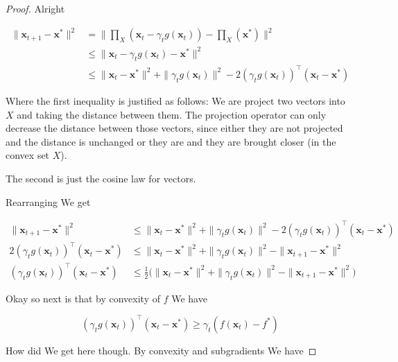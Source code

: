 \documentclass{article}
\begin{document}
		\begin{proof}
			Alright
			
			\begin{align*}
				\|\mathbf{x}_{t+1} - \mathbf{x}^* \|^2 &= \| \prod_X(\mathbf{x}_t - \gamma_t g(\mathbf{x}_t)) - \prod_X(\mathbf{x}^*) \|^2 \\
				&\le \| \mathbf{x}_t - \gamma_t g(\mathbf{x}_t) - \mathbf{x}^* \|^2\\
				&\le \| \mathbf{x}_t - \mathbf{x}^* \|^2  + \|\gamma_t g(\mathbf{x}_t) \|^2 - 2(\gamma_t g(\mathbf{x}_t))^\top ( \mathbf{x}_t - \mathbf{x}^*)
			\end{align*}
			
			Where the first inequality is justified as follows: We are project two vectors into $X$ and taking the distance between them. The projection operator can only decrease the distance between those vectors, since either they are not projected and the distance is unchanged or they are and they are brought closer (in the convex set $X$).
			
			The second is just the cosine law for vectors.
			
			Rearranging We get
			
			\begin{align*}
				\|\mathbf{x}_{t+1} - \mathbf{x}^* \|^2 &\le \| \mathbf{x}_t - \mathbf{x}^* \|^2  + \|\gamma_t g(\mathbf{x}_t) \|^2 - 2(\gamma_t g(\mathbf{x}_t))^\top ( \mathbf{x}_t - \mathbf{x}^*)\\
				 2(\gamma_t g(\mathbf{x}_t))^\top ( \mathbf{x}_t - \mathbf{x}^*)&\le \| \mathbf{x}_t - \mathbf{x}^* \|^2  + \|\gamma_t g(\mathbf{x}_t) \|^2  - \|\mathbf{x}_{t+1} - \mathbf{x}^* \|^2\\
				(\gamma_t g(\mathbf{x}_t))^\top ( \mathbf{x}_t - \mathbf{x}^*)&\le\frac{1}{2}\big( \| \mathbf{x}_t - \mathbf{x}^* \|^2  + \|\gamma_t g(\mathbf{x}_t) \|^2  - \|\mathbf{x}_{t+1} - \mathbf{x}^* \|^2 \big)
			\end{align*}
			
			Okay so next is that by convexity of $f$ We have
			
			\[ (\gamma_t g(\mathbf{x}_t))^\top ( \mathbf{x}_t - \mathbf{x}^*) \ge \gamma_t(f(\mathbf{x}_t )- f^*)  \]
			
			How did We get here though. By convexity and subgradients We have
			

\end{proof}
\end{document}
